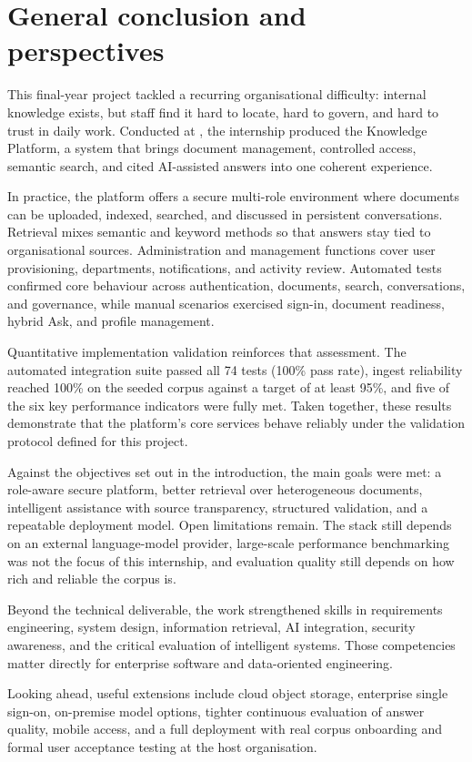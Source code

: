 \chapter*{General conclusion and perspectives}

This final-year project tackled a recurring organisational difficulty: internal
knowledge exists, but staff find it hard to locate, hard to govern, and hard to
trust in daily work. Conducted at \CompanyName{}, the internship produced the
Knowledge Platform, a system that brings document management, controlled access,
semantic search, and cited AI-assisted answers into one coherent experience.

In practice, the platform offers a secure multi-role environment where documents
can be uploaded, indexed, searched, and discussed in persistent conversations.
Retrieval mixes semantic and keyword methods so that answers stay tied to
organisational sources. Administration and management functions cover user
provisioning, departments, notifications, and activity review. Automated tests
confirmed core behaviour across authentication, documents, search, conversations,
and governance, while manual scenarios exercised sign-in, document readiness,
hybrid Ask, and profile management.

Quantitative implementation validation reinforces that assessment. The automated
integration suite passed all 74 tests (100\% pass rate), ingest reliability reached
100\% on the seeded corpus against a target of at least 95\%, and five of the six
key performance indicators were fully met. Taken together, these results
demonstrate that the platform's core services behave reliably under the validation
protocol defined for this project.

Against the objectives set out in the introduction, the main goals were met: a
role-aware secure platform, better retrieval over heterogeneous documents,
intelligent assistance with source transparency, structured validation, and a
repeatable deployment model. Open limitations remain. The stack still depends on
an external language-model provider, large-scale performance benchmarking was not
the focus of this internship, and evaluation quality still depends on how rich and
reliable the corpus is.

Beyond the technical deliverable, the work strengthened skills in requirements
engineering, system design, information retrieval, AI integration, security
awareness, and the critical evaluation of intelligent systems. Those competencies
matter directly for enterprise software and data-oriented engineering.

Looking ahead, useful extensions include cloud object storage, enterprise single
sign-on, on-premise model options, tighter continuous evaluation of answer
quality, mobile access, and a full deployment with real corpus onboarding and
formal user acceptance testing at the host organisation.
